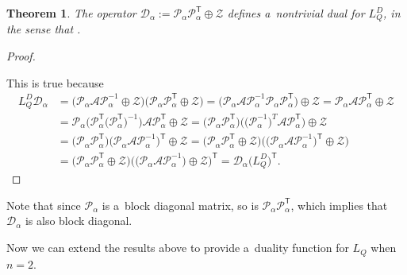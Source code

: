 \documentclass[pdftex]{sigma}
\numberwithin{equation}{section}
\newtheorem{Theorem}{Theorem}[section]
\theoremstyle{definition}
\begin{document}
\begin{Theorem}
\label{DiagonalStrategy}
The operator $\mathcal{D}_\alpha := \mathcal{P}_\alpha \mathcal{P}_{\alpha}^{\mathsf{T}} \oplus \mathcal{Z}$ defines a~nontrivial dual for $L_Q^D$, in the sense that .
\end{Theorem}
\begin{proof} \label{DiagonalStrategyProof}

This is true because
 \begin{align*}
 L_Q^D \mathcal{D}_\alpha &= \bigl(\mathcal{P}_\alpha \mathcal{A} \mathcal{P}_\alpha^{-1} \oplus \mathcal{Z}\bigr)\bigl(\mathcal{P}_\alpha \mathcal{P}_\alpha^{\mathsf{T}} \oplus \mathcal{Z}\bigr)
 = \bigl(\mathcal{P}_\alpha \mathcal{A} \mathcal{P}_\alpha^{-1} \mathcal{P}_\alpha \mathcal{P}_\alpha^{\mathsf{T}}\bigr) \oplus \mathcal{Z}
 = \mathcal{P}_\alpha \mathcal{A} \mathcal{P}_\alpha^{\mathsf{T}} \oplus \mathcal{Z}\\
 &= \mathcal{P}_\alpha \bigl(\mathcal{P}_\alpha^{\mathsf{T}} \bigl(\mathcal{P}_\alpha^{\mathsf{T}}\bigr)^{-1}\bigr)\mathcal{A} \mathcal{P}_\alpha^{\mathsf{T}} \oplus \mathcal{Z} = \bigl(\mathcal{P}_\alpha \mathcal{P}_\alpha^{\mathsf{T}}\bigr)\bigl(\bigl(\mathcal{P}_\alpha^{-1}\bigr)^{T}\mathcal{A} \mathcal{P}_\alpha^{\mathsf{T}} \bigr) \oplus \mathcal{Z}
 \\
 & = \bigl(\mathcal{P}_\alpha \mathcal{P}_\alpha^{\mathsf{T}} \bigr)\bigl(\mathcal{P}_\alpha \mathcal{A} \mathcal{P}_\alpha^{-1} \bigr)^{\mathsf{T}} \oplus \mathcal{Z}
 = \bigl(\mathcal{P}_\alpha \mathcal{P}_\alpha^{\mathsf{T}} \oplus \mathcal{Z} \bigr)\bigl(\bigl(\mathcal{P}_\alpha \mathcal{A} \mathcal{P}_\alpha^{-1}\bigr)^{\mathsf{T}} \oplus \mathcal{Z}\bigr) \\
 &
 = \bigl(\mathcal{P}_\alpha \mathcal{P}_\alpha^{\mathsf{T}} \oplus \mathcal{Z}\bigr)\bigl(\bigl(\mathcal{P}_\alpha \mathcal{A} \mathcal{P}_\alpha^{-1}\bigr) \oplus \mathcal{Z}\bigr)^{\mathsf{T}}
 = \mathcal{D}_\alpha \bigl(L_Q^D\bigr)^{\mathsf{T}}.\tag*{\qed}
 \end{align*}\renewcommand{\qed}{}
\end{proof}


Note that since $\mathcal{P}_\alpha$ is a~block diagonal matrix, so is $\mathcal{P}_\alpha \mathcal{P}_\alpha^{\mathsf{T}}$, which implies that $\mathcal{D}_\alpha$ is also block diagonal.

Now we can extend the results above to provide a~duality function for $L_Q$ when $n=2$.
\end{document}
